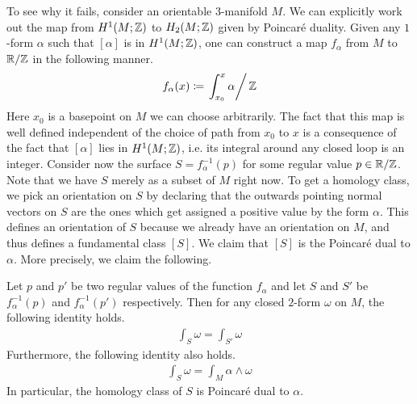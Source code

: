 To see why it fails, consider an orientable $3$-manifold $M$. We can explicitly work out the map
from $H^1(M; \mathbb{Z})$ to $H_2(M; \mathbb{Z})$ given by Poincar\'e duality. Given any $1$-form $\alpha$ such
that $[\alpha]$ is in $H^1(M; \mathbb{Z})$, one can construct a map $f_{\alpha}$ from $M$ to $\mathbb{R}/\mathbb{Z}$ in
the following manner.
\begin{align*}
  f_{\alpha}(x) \coloneqq \left. \int_{x_0}^x \alpha \right/ \mathbb{Z}
\end{align*}
Here $x_0$ is a basepoint on $M$ we can choose arbitrarily. The fact that this map is well defined
independent of the choice of path from $x_0$ to $x$ is a consequence of the fact that $[\alpha]$
lies in $H^1(M; \mathbb{Z})$, i.e.  its integral around any closed loop is an integer. Consider now the
surface $S = f_{\alpha}^{-1}(p)$ for some regular value $p \in \mathbb{R}/\mathbb{Z}$. Note that we have $S$
merely as a subset of $M$ right now. To get a homology class, we pick an orientation on $S$ by
declaring that the outwards pointing normal vectors on $S$ are the ones which get assigned a
positive value by the form $\alpha$. This defines an orientation of $S$ because we already have an
orientation on $M$, and thus defines a fundamental class $[S]$. We claim that $[S]$ is the
Poincar\'e dual to $\alpha$. More precisely, we claim the following.
\begin{claim}
  Let $p$ and $p'$ be two regular values of the function $f_{\alpha}$ and let $S$ and $S'$ be
  $f_{\alpha}^{-1}(p)$ and $f^{-1}_{\alpha}(p')$ respectively. Then for any closed $2$-form $\omega$ on $M$, the following
  identity holds.
  \begin{align*}
    \int_{S} \omega = \int_{S'} \omega
  \end{align*}
  Furthermore, the following identity also holds.
  \begin{align*}
    \int_S \omega = \int_M \alpha \wedge \omega
  \end{align*}
  In particular, the homology class of $S$ is Poincar\'e dual to $\alpha$.
\end{claim}
